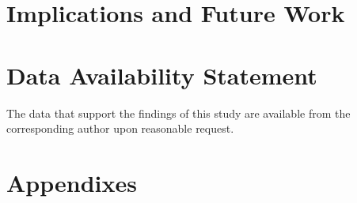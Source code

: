 \section{\label{sec:implications}Implications and Future Work}


\begin{acknowledgments}

\end{acknowledgments}

\section*{Data Availability Statement}
The data that support the findings of this study are available from the corresponding author upon reasonable request.

\appendix

\section{Appendixes}




